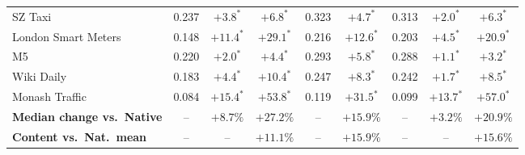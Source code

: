 \begin{table}[t]
{\begin{tabular}{@{}lccc cc ccc@{}}
SZ Taxi
& 0.237 & $+3.8^{*}$ & $+6.8^{*}$
& 0.323 & $+4.7^{*}$
& 0.313 & $+2.0^{*}$ & $+6.3^{*}$ \\
London Smart Meters
& 0.148 & $+11.4^{*}$ & $+29.1^{*}$
& 0.216 & $+12.6^{*}$
& 0.203 & $+4.5^{*}$ & $+20.9^{*}$ \\
M5
& 0.220 & $+2.0^{*}$ & $+4.4^{*}$
& 0.293 & $+5.8^{*}$
& 0.288 & $+1.1^{*}$ & $+3.2^{*}$ \\
Wiki Daily
& 0.183 & $+4.4^{*}$ & $+10.4^{*}$
& 0.247 & $+8.3^{*}$
& 0.242 & $+1.7^{*}$ & $+8.5^{*}$ \\
Monash Traffic
& 0.084 & $+15.4^{*}$ & $+53.8^{*}$
& 0.119 & $+31.5^{*}$
& 0.099 & $+13.7^{*}$ & $+57.0^{*}$ \\
\midrule
\textbf{Median change vs.\ Native}
& -- & $\mathbf{+8.7\%}$ & $\mathbf{+27.2\%}$
& -- & $\mathbf{+15.9\%}$
& -- & $\mathbf{+3.2\%}$ & $\mathbf{+20.9\%}$ \\
\textbf{Content vs.\ Nat.\ mean}
& -- & -- & $\mathbf{+11.1\%}$
& -- & $\mathbf{+15.9\%}$
& -- & -- & $\mathbf{+15.6\%}$ \\
\bottomrule
\end{tabular}%
}
\end{table}


